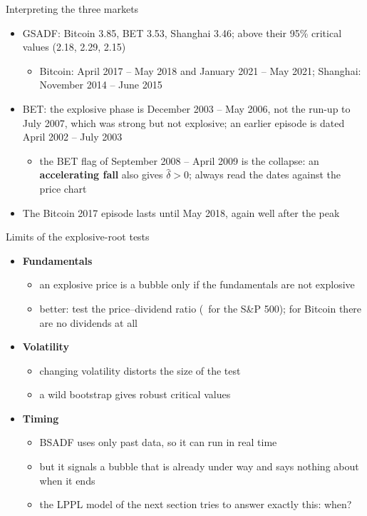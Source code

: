 \begin{frame}{Interpreting the three markets}
\itemsize{\small}
\begin{itemize}
    \item GSADF: Bitcoin 3.85, BET 3.53, Shanghai 3.46; above their 95\% critical values (2.18, 2.29, 2.15)
    \begin{itemize}
        \item Bitcoin: April 2017 -- May 2018 and January 2021 -- May 2021; Shanghai: November 2014 -- June 2015
    \end{itemize}
    \item BET: the explosive phase is December 2003 -- May 2006, not the run-up to July 2007, which was strong but not explosive; an earlier episode is dated April 2002 -- July 2003
    \begin{itemize}
        \item the BET flag of September 2008 -- April 2009 is the collapse: an \textbf{accelerating fall} also gives $\hat\delta > 0$; always read the dates against the price chart
    \end{itemize}
    \item The Bitcoin 2017 episode lasts until May 2018, again well after the peak
\end{itemize}
\end{frame}

\begin{frame}{Limits of the explosive-root tests}
\itemsize{\small}
\begin{itemize}
    \item \textbf{Fundamentals}
    \begin{itemize}
        \item an explosive price is a bubble only if the fundamentals are not explosive
        \item better: test the price--dividend ratio (\ for the S\&P 500); for Bitcoin there are no dividends at all
    \end{itemize}
    \item \textbf{Volatility}
    \begin{itemize}
        \item changing volatility distorts the size of the test
        \item a wild bootstrap gives robust critical values 
    \end{itemize}
    \item \textbf{Timing}
    \begin{itemize}
        \item BSADF uses only past data, so it can run in real time
        \item but it signals a bubble that is already under way and says nothing about when it ends
        \item the LPPL model of the next section tries to answer exactly this: when?
    \end{itemize}
\end{itemize}
\end{frame}


